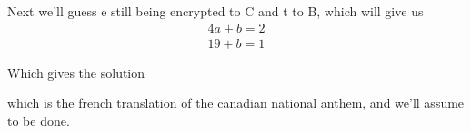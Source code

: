 \documentclass[paper=a4, fontsize=11pt]{scrartcl} %
\numberwithin{equation}{section} %
\numberwithin{figure}{section} %
\numberwithin{table}{section} %
\begin{document}
	Next we'll guess e still being encrypted to C and t to B, which will give us 
	\begin{align*}
	4a+b=2 \\
	19+b=1
	\end{align*}

	Which gives the solution
	\begin{quote}
	\end{quote}
	
	which is the french translation of the canadian national anthem, and we'll assume to be done.
	
\end{document}

